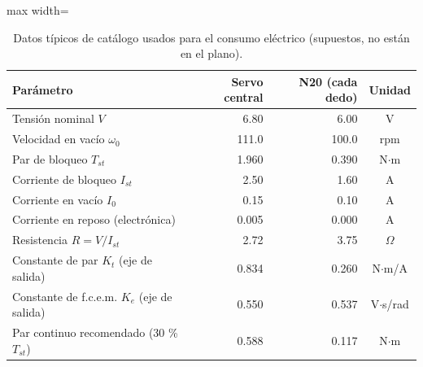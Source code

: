 \begin{table}[H]
\centering

\begin{adjustbox}{max width=\textwidth}
\begin{tabular}{|l|r|r|c|}
\hline
\textbf{Parámetro} & \textbf{Servo central} & \textbf{N20 (cada dedo)} & \textbf{Unidad} \\ \hline
Tensión nominal $V$ & 6.80 & 6.00 & V \\ \hline
Velocidad en vacío $\omega_0$ & 111.0 & 100.0 & rpm \\ \hline
Par de bloqueo $T_{st}$ & 1.960 & 0.390 & N$\cdot$m \\ \hline
Corriente de bloqueo $I_{st}$ & 2.50 & 1.60 & A \\ \hline
Corriente en vacío $I_0$ & 0.15 & 0.10 & A \\ \hline
Corriente en reposo (electrónica) & 0.005 & 0.000 & A \\ \hline
Resistencia $R = V/I_{st}$ & 2.72 & 3.75 & $\Omega$ \\ \hline
Constante de par $K_t$ (eje de salida) & 0.834 & 0.260 & N$\cdot$m/A \\ \hline
Constante de f.c.e.m. $K_e$ (eje de salida) & 0.550 & 0.537 & V$\cdot$s/rad \\ \hline
Par continuo recomendado (30 \% $T_{st}$) & 0.588 & 0.117 & N$\cdot$m \\ \hline
\end{tabular}
\end{adjustbox}
\caption{Datos típicos de catálogo usados para el consumo eléctrico (supuestos, no están en el plano).}
\label{tab:motores}
\end{table}